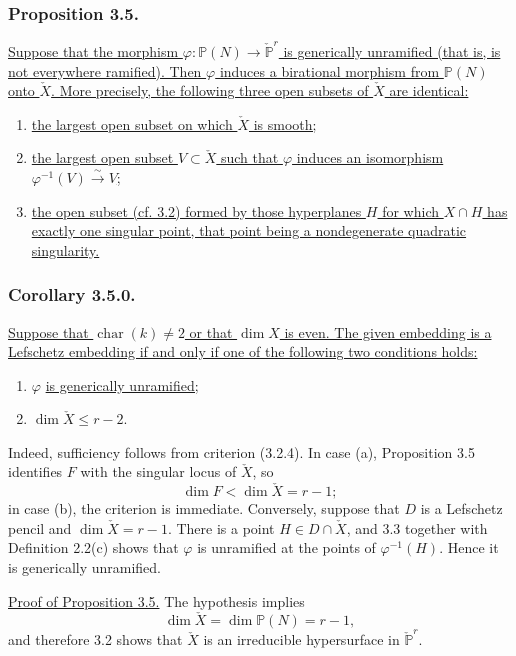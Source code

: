 \subsubsection*{Proposition 3.5.}
\underline{Suppose that the morphism
$\varphi:\mathbb P(N)\to\check{\mathbb P}^{r}$ is generically
unramified (that is, is not everywhere ramified).  Then $\varphi$
induces a birational morphism from $\mathbb P(N)$ onto $\check X$.
More precisely, the following three open subsets of $\check X$ are
identical:}
\begin{enumerate}
\item[(a)] \underline{the largest open subset on which $\check X$ is
smooth;}
\item[(b)] \underline{the largest open subset $V\subset\check X$ such
that $\varphi$ induces an isomorphism
$\varphi^{-1}(V)\xrightarrow{\sim}V$;}
\item[(c)] \underline{the open subset (cf. 3.2) formed by those
hyperplanes $H$ for which $X\cap H$ has exactly one singular point,
that point being a nondegenerate quadratic singularity.}
\end{enumerate}

\subsubsection*{Corollary 3.5.0.}
\underline{Suppose that $\operatorname{char}(k)\ne2$ or that $\dim X$
is even.  The given embedding is a Lefschetz embedding if and only if
one of the following two conditions holds:}
\begin{enumerate}
\item[(a)] $\varphi$ \underline{is generically unramified;}
\item[(b)] $\dim\check X\leq r-2$.
\end{enumerate}

Indeed, sufficiency follows from criterion (3.2.4).  In case (a),
Proposition 3.5 identifies $F$ with the singular locus of $\check X$,
so
\[
\dim F<\dim\check X=r-1;
\]
in case (b), the criterion is immediate.  Conversely, suppose that
$D$ is a Lefschetz pencil and $\dim\check X=r-1$.  There is a point
$H\in D\cap\check X$, and 3.3 together with Definition 2.2(c) shows
that $\varphi$ is unramified at the points of $\varphi^{-1}(H)$.
Hence it is generically unramified.

\noindent\underline{Proof of Proposition 3.5.}
The hypothesis implies
\[
\dim\check X=\dim\mathbb P(N)=r-1,
\]
and therefore 3.2 shows that $\check X$ is an irreducible hypersurface
in $\check{\mathbb P}^{r}$.

